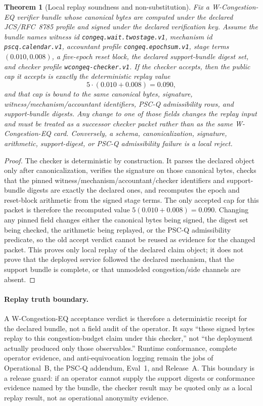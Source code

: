 \documentclass[11pt]{article}
\newtheorem{theorem}{Theorem}
\begin{document}
\begin{theorem}[Local replay soundness and non-substitution]
Fix a W-Congestion-EQ verifier bundle whose canonical bytes are computed under the declared JCS/RFC~8785 profile and signed under the declared verification key.
Assume the bundle names witness id \texttt{congeq.wait.twostage.v1}, mechanism id \texttt{pscq.calendar.v1}, accountant profile \texttt{congeq.epochsum.v1}, stage terms $(0.010,0.008)$, a five-epoch reset block, the declared support-bundle digest set, and checker profile \texttt{wcongeq-checker.v1}.
If the checker accepts, then the public cap it accepts is exactly the deterministic replay value
\[
  5\cdot(0.010+0.008)=0.090,
\]
and that cap is bound to the same canonical bytes, signature, witness/mechanism/accountant identifiers, PSC-Q admissibility rows, and support-bundle digests.
Any change to one of those fields changes the replay input and must be treated as a successor checker packet rather than as the same W-Congestion-EQ card.
Conversely, a schema, canonicalization, signature, arithmetic, support-digest, or PSC-Q admissibility failure is a local reject.
\end{theorem}
\begin{proof}
The checker is deterministic by construction.
It parses the declared object only after canonicalization, verifies the signature on those canonical bytes, checks that the pinned witness/mechanism/accountant/checker identifiers and support-bundle digests are exactly the declared ones, and recomputes the epoch and reset-block arithmetic from the signed stage terms.
The only accepted cap for this packet is therefore the recomputed value $5(0.010+0.008)=0.090$.
Changing any pinned field changes either the canonical bytes being signed, the digest set being checked, the arithmetic being replayed, or the PSC-Q admissibility predicate, so the old accept verdict cannot be reused as evidence for the changed packet.
This proves only local replay of the declared claim object; it does not prove that the deployed service followed the declared mechanism, that the support bundle is complete, or that unmodeled congestion/side channels are absent.
\end{proof}

\paragraph{Replay truth boundary.}
A W-Congestion-EQ acceptance verdict is therefore a deterministic receipt for the declared bundle, not a field audit of the operator.
It says ``these signed bytes replay to this congestion-budget claim under this checker,'' not ``the deployment actually produced only those observables.''
Runtime conformance, complete operator evidence, and anti-equivocation logging remain the jobs of Operational~B, the PSC-Q addendum, Eval~1, and Release~A.
This boundary is a release guard: if an operator cannot supply the support digests or conformance evidence named by the bundle, the checker result may be quoted only as a local replay result, not as operational anonymity evidence.
\end{document}
